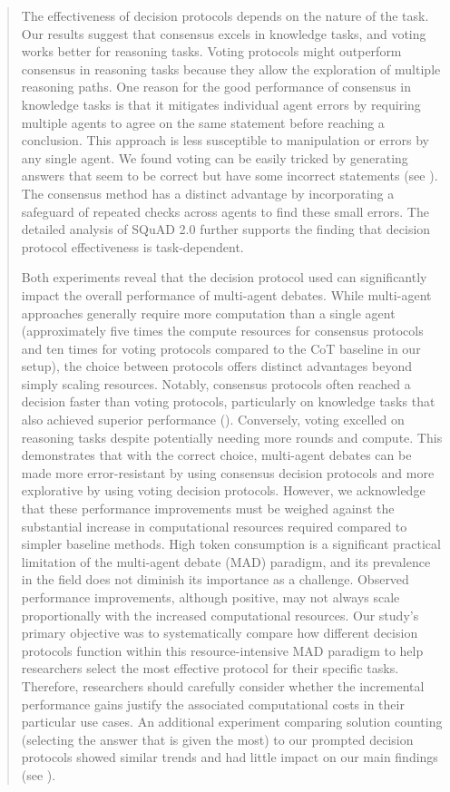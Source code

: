 \documentclass[11pt]{article}
\begin{document}
\begin{abstract}
The effectiveness of decision protocols depends on the nature of the task. 
Our results suggest that consensus excels in knowledge tasks, and voting works better for reasoning tasks.
Voting protocols might outperform consensus in reasoning tasks because they allow the exploration of multiple reasoning paths. %
One reason for the good performance of consensus in knowledge tasks is that it mitigates individual agent errors by requiring multiple agents to agree on the same statement before reaching a conclusion. 
This approach is less susceptible to manipulation or errors by any single agent. 
We found voting can be easily tricked by generating answers that seem to be correct but have some incorrect statements (see ).
The consensus method has a distinct advantage by incorporating a safeguard of repeated checks across agents to find these small errors.
The detailed analysis of SQuAD 2.0 further supports the finding that decision protocol effectiveness is task-dependent. 


Both experiments reveal that the decision protocol used can significantly impact the overall performance of multi-agent debates.
While multi-agent approaches generally require more computation than a single agent (approximately five times the compute resources for consensus protocols and ten times for voting protocols compared to the CoT baseline in our setup), the choice between protocols offers distinct advantages beyond simply scaling resources.
Notably, consensus protocols often reached a decision faster than voting protocols, particularly on knowledge tasks that also achieved superior performance ().
Conversely, voting excelled on reasoning tasks despite potentially needing more rounds and compute. 
This demonstrates that with the correct choice, multi-agent debates can be made more error-resistant by using consensus decision protocols and more explorative by using voting decision protocols. 
However, we acknowledge that these performance improvements must be weighed against the substantial increase in computational resources required compared to simpler baseline methods. 
High token consumption is a significant practical limitation of the multi-agent debate (MAD) paradigm, and its prevalence in the field does not diminish its importance as a challenge. 
Observed performance improvements, although positive, may not always scale proportionally with the increased computational resources.
Our study's primary objective was to systematically compare how different decision protocols function within this resource-intensive MAD paradigm to help researchers select the most effective protocol for their specific tasks.  
Therefore, researchers should carefully consider whether the incremental performance gains justify the associated computational costs in their particular use cases.
An additional experiment comparing solution counting (selecting the answer that is given the most) to our prompted decision protocols showed similar trends and had little impact on our main findings (see ).





\end{abstract}
\end{document}
